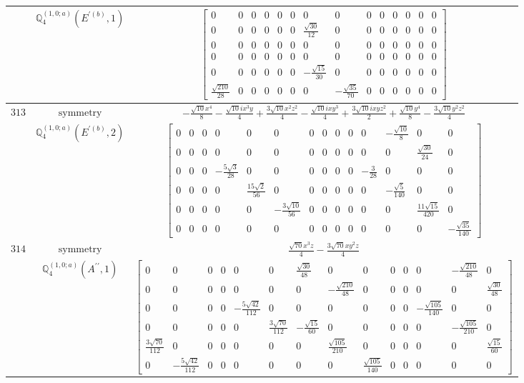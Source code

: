 \documentclass[fleqn,8pt,landscape]{jsarticle}
\begin{document}
\begin{longtable}{ccc}
$  $ & $ \mathbb{Q}_{4}^{(1,0;a)}(E^{\prime(b)},1) $ & $ \begin{bmatrix} 0 & 0 & 0 & 0 & 0 & 0 & 0 & 0 & 0 & 0 & 0 & 0 & 0 & 0 \\ 0 & 0 & 0 & 0 & 0 & 0 & \frac{\sqrt{30}}{12} & 0 & 0 & 0 & 0 & 0 & 0 & 0 \\ 0 & 0 & 0 & 0 & 0 & 0 & 0 & 0 & 0 & 0 & 0 & 0 & 0 & 0 \\ 0 & 0 & 0 & 0 & 0 & 0 & 0 & 0 & 0 & 0 & 0 & 0 & 0 & 0 \\ 0 & 0 & 0 & 0 & 0 & 0 & - \frac{\sqrt{15}}{30} & 0 & 0 & 0 & 0 & 0 & 0 & 0 \\ \frac{\sqrt{210}}{28} & 0 & 0 & 0 & 0 & 0 & 0 & - \frac{\sqrt{35}}{70} & 0 & 0 & 0 & 0 & 0 & 0 \end{bmatrix} $ \\ \hline
$ 313 $ & $ \text{symmetry} $ & $ - \frac{\sqrt{10} x^{4}}{8} - \frac{\sqrt{10} i x^{3} y}{4} + \frac{3 \sqrt{10} x^{2} z^{2}}{4} - \frac{\sqrt{10} i x y^{3}}{4} + \frac{3 \sqrt{10} i x y z^{2}}{2} + \frac{\sqrt{10} y^{4}}{8} - \frac{3 \sqrt{10} y^{2} z^{2}}{4} $ \\
$  $ & $ \mathbb{Q}_{4}^{(1,0;a)}(E^{\prime(b)},2) $ & $ \begin{bmatrix} 0 & 0 & 0 & 0 & 0 & 0 & 0 & 0 & 0 & 0 & 0 & - \frac{\sqrt{10}}{8} & 0 & 0 \\ 0 & 0 & 0 & 0 & 0 & 0 & 0 & 0 & 0 & 0 & 0 & 0 & \frac{\sqrt{30}}{24} & 0 \\ 0 & 0 & 0 & - \frac{5 \sqrt{3}}{28} & 0 & 0 & 0 & 0 & 0 & 0 & - \frac{3}{28} & 0 & 0 & 0 \\ 0 & 0 & 0 & 0 & \frac{15 \sqrt{2}}{56} & 0 & 0 & 0 & 0 & 0 & 0 & - \frac{\sqrt{5}}{140} & 0 & 0 \\ 0 & 0 & 0 & 0 & 0 & - \frac{3 \sqrt{10}}{56} & 0 & 0 & 0 & 0 & 0 & 0 & \frac{11 \sqrt{15}}{420} & 0 \\ 0 & 0 & 0 & 0 & 0 & 0 & 0 & 0 & 0 & 0 & 0 & 0 & 0 & - \frac{\sqrt{35}}{140} \end{bmatrix} $ \\ \hline
$ 314 $ & $ \text{symmetry} $ & $ \frac{\sqrt{70} x^{3} z}{4} - \frac{3 \sqrt{70} x y^{2} z}{4} $ \\
$  $ & $ \mathbb{Q}_{4}^{(1,0;a)}(A^{\prime\prime},1) $ & $ \begin{bmatrix} 0 & 0 & 0 & 0 & 0 & 0 & \frac{\sqrt{30}}{48} & 0 & 0 & 0 & 0 & 0 & - \frac{\sqrt{210}}{48} & 0 \\ 0 & 0 & 0 & 0 & 0 & 0 & 0 & - \frac{\sqrt{210}}{48} & 0 & 0 & 0 & 0 & 0 & \frac{\sqrt{30}}{48} \\ 0 & 0 & 0 & 0 & - \frac{5 \sqrt{42}}{112} & 0 & 0 & 0 & 0 & 0 & 0 & - \frac{\sqrt{105}}{140} & 0 & 0 \\ 0 & 0 & 0 & 0 & 0 & \frac{3 \sqrt{70}}{112} & - \frac{\sqrt{15}}{60} & 0 & 0 & 0 & 0 & 0 & - \frac{\sqrt{105}}{210} & 0 \\ \frac{3 \sqrt{70}}{112} & 0 & 0 & 0 & 0 & 0 & 0 & \frac{\sqrt{105}}{210} & 0 & 0 & 0 & 0 & 0 & \frac{\sqrt{15}}{60} \\ 0 & - \frac{5 \sqrt{42}}{112} & 0 & 0 & 0 & 0 & 0 & 0 & \frac{\sqrt{105}}{140} & 0 & 0 & 0 & 0 & 0 \end{bmatrix} $ \\ \hline

\end{longtable}
\end{document}
